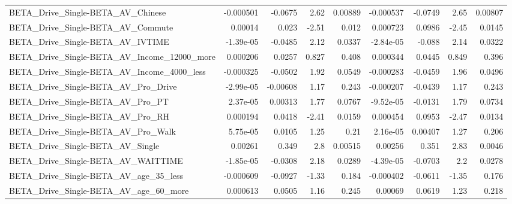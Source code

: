 \begin{tabular}{lrrrrrrrr}
BETA\_Drive\_Single-BETA\_AV\_Chinese                  &   -0.000501 &      -0.0675 &      2.62 &  0.00889 &  -0.000537 &     -0.0749 &         2.65 &       0.00807 \\
BETA\_Drive\_Single-BETA\_AV\_Commute                  &     0.00014 &        0.023 &     -2.51 &    0.012 &   0.000723 &      0.0986 &        -2.45 &        0.0145 \\
BETA\_Drive\_Single-BETA\_AV\_IVTIME                   &   -1.39e-05 &      -0.0485 &      2.12 &   0.0337 &  -2.84e-05 &      -0.088 &         2.14 &        0.0322 \\
BETA\_Drive\_Single-BETA\_AV\_Income\_12000\_more        &    0.000206 &       0.0257 &     0.827 &    0.408 &   0.000344 &      0.0445 &        0.849 &         0.396 \\
BETA\_Drive\_Single-BETA\_AV\_Income\_4000\_less         &   -0.000325 &      -0.0502 &      1.92 &   0.0549 &  -0.000283 &     -0.0459 &         1.96 &        0.0496 \\
BETA\_Drive\_Single-BETA\_AV\_Pro\_Drive                &   -2.99e-05 &     -0.00608 &      1.17 &    0.243 &  -0.000207 &     -0.0439 &         1.17 &         0.243 \\
BETA\_Drive\_Single-BETA\_AV\_Pro\_PT                   &    2.37e-05 &      0.00313 &      1.77 &   0.0767 &  -9.52e-05 &     -0.0131 &         1.79 &        0.0734 \\
BETA\_Drive\_Single-BETA\_AV\_Pro\_RH                   &    0.000194 &       0.0418 &     -2.41 &   0.0159 &   0.000454 &      0.0953 &        -2.47 &        0.0134 \\
BETA\_Drive\_Single-BETA\_AV\_Pro\_Walk                 &    5.75e-05 &       0.0105 &      1.25 &     0.21 &   2.16e-05 &     0.00407 &         1.27 &         0.206 \\
BETA\_Drive\_Single-BETA\_AV\_Single                   &     0.00261 &        0.349 &       2.8 &  0.00515 &    0.00256 &       0.351 &         2.83 &        0.0046 \\
BETA\_Drive\_Single-BETA\_AV\_WAITTIME                 &   -1.85e-05 &      -0.0308 &      2.18 &   0.0289 &  -4.39e-05 &     -0.0703 &          2.2 &        0.0278 \\
BETA\_Drive\_Single-BETA\_AV\_age\_35\_less              &   -0.000609 &      -0.0927 &     -1.33 &    0.184 &  -0.000402 &     -0.0611 &        -1.35 &         0.176 \\
BETA\_Drive\_Single-BETA\_AV\_age\_60\_more              &    0.000613 &       0.0505 &      1.16 &    0.245 &    0.00069 &      0.0619 &         1.23 &         0.218 \\

\end{tabular}
